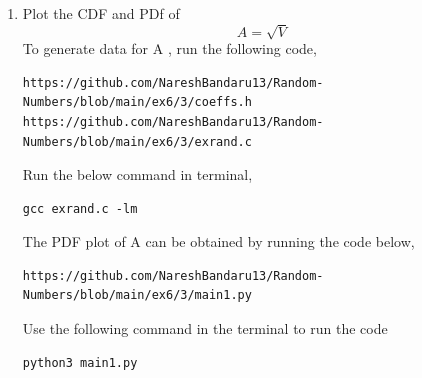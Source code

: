 \documentclass[journal,12pt,twocolumn]{IEEEtran}
\renewcommand\thesection{\arabic{section}}
\begin{document}
\begin{enumerate}[label=\thesection.\arabic*
,ref=\thesection.\theenumi]
\begin{align*}
\end{align*}
$F_V(x)$ is given by:
\begin{align*}
    F_V(x) &= F_{X_1^2+X_2^2}(x) \\
    &= F_{R^2}{x} \\
    &= \pr{R^2 \leq x} \\
    &= \pr{R \leq \sqrt{x}} 
\end{align*}
Therefore, 
\begin{align*}
    F_V(x) = 
    \begin{cases}
        0 ,& x < 0 \\
        1 - e^{-\frac{x}{2}}, & x \geq  0\\
    \end{cases}
\end{align*}
by Comparing  we get $\alpha = \frac{1}{2}$ \\


\item Plot the CDF and PDf of
$$A = \sqrt{V}$$
\solution
To generate data for A , run the following code,
\begin{lstlisting}
https://github.com/NareshBandaru13/Random-Numbers/blob/main/ex6/3/coeffs.h
https://github.com/NareshBandaru13/Random-Numbers/blob/main/ex6/3/exrand.c
\end{lstlisting}
Run the below command in terminal,
\begin{lstlisting}
gcc exrand.c -lm
\end{lstlisting}
The PDF plot of A can be obtained by running the code below,
\begin{lstlisting}
https://github.com/NareshBandaru13/Random-Numbers/blob/main/ex6/3/main1.py
\end{lstlisting}
Use the following command in the terminal to run the code
\begin{lstlisting}
python3 main1.py
\end{lstlisting}


\end{enumerate}
\end{document}
